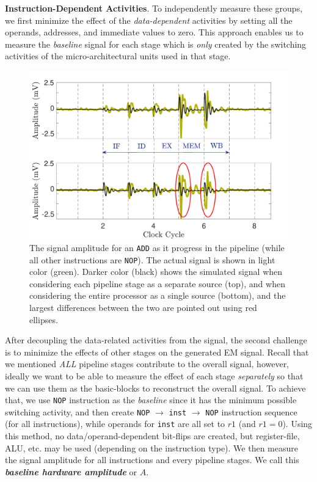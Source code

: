 \documentclass[11 pt]{article}
\begin{document}
\noindent \textbf{Instruction-Dependent Activities}. To independently measure these groups, we first minimize the effect of the \textit{data-dependent} activities by setting all the operands, addresses, and immediate values to zero. This approach enables us to measure the \textit{baseline} signal for each stage which is \textit{only} created by the switching activities of the micro-architectural units used in that stage.
\begin{figure}
	\centering
	\includegraphics[width=0.4\columnwidth,clip]{figure/amp2.pdf}
	\caption{The signal amplitude for an {\tt ADD} as it progress in the pipeline (while all other instructions are {\tt NOP}). The actual signal is shown in light color (green). Darker color (black) shows the simulated signal when considering each pipeline stage as a separate source (top), and when considering the entire processor as a single source (bottom), and the largest differences between the two are pointed out using red ellipses.}
	\label{fig:amp}
	\vspace{-5mm}
\end{figure}

After decoupling the data-related activities from the signal, the second challenge is to minimize the effects of other stages on the generated EM signal. Recall that we mentioned \textit{ALL} pipeline stages contribute to the overall signal, however, ideally we want to be able to measure the effect of each stage \textit{separately} so that we can use them as the basic-blocks to reconstruct the overall signal. To achieve that, we use {\tt NOP}
instruction as the \textit{baseline} since it has the minimum possible switching activity, and then create {\tt NOP} $\rightarrow$ {\tt inst} $\rightarrow$ {\tt NOP} instruction sequence (for all instructions), while operands for {\tt inst} are all set to $r1$ (and $r1 = 0$). Using this method, no data/operand-dependent bit-flips are created, but register-file, ALU, etc. may be used (depending on the instruction type). We then measure the signal amplitude for all instructions and every pipeline stages. We call this \textbf{\textit{baseline hardware amplitude}} or \textbf{\textit{$A$}}.
\end{document}
